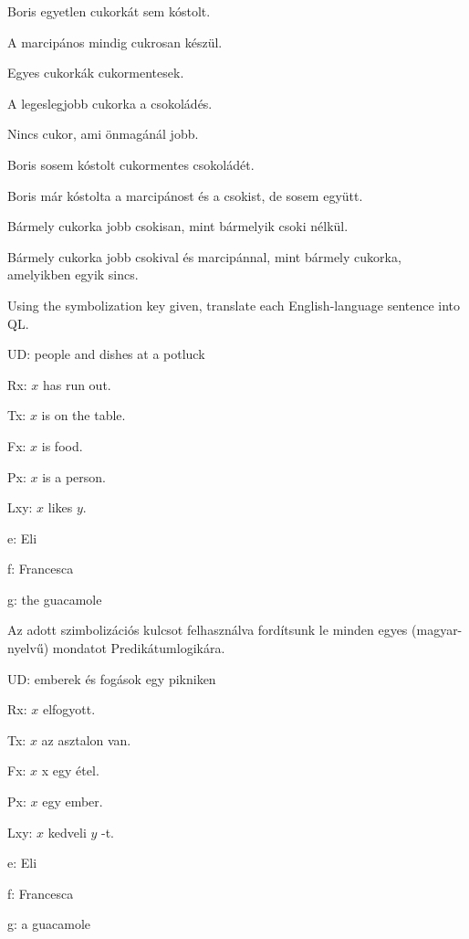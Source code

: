 \begin{earg}
\item Boris egyetlen cukorkát sem kóstolt.
\item A marcipános mindig cukrosan készül.
\item Egyes cukorkák cukormentesek.
\item A legeslegjobb cukorka a csokoládés.
\item Nincs cukor, ami önmagánál jobb.
\item Boris sosem kóstolt cukormentes csokoládét.
\item Boris már kóstolta a marcipánost és a csokist, de sosem együtt.
\item Bármely cukorka jobb csokisan, mint bármelyik csoki nélkül.
\item Bármely cukorka jobb csokival és marcipánnal, mint bármely cukorka, amelyikben egyik sincs.
\end{earg}

\problempart
Using the symbolization key given, translate each English-language sentence into QL.
\begin{ekey}
\item[UD:] people and dishes at a potluck
\item[Rx:] $x$ has run out.
\item[Tx:] $x$ is on the table.
\item[Fx:] $x$ is food.
\item[Px:] $x$ is a person.
\item[Lxy:] $x$ likes $y$.
\item[e:] Eli
\item[f:] Francesca
\item[g:] the guacamole
\end{ekey}

\problempart
Az adott szimbolizációs kulcsot felhasználva fordítsunk le minden egyes (magyar-nyelvű) mondatot Predikátumlogikára.
\begin{ekey}
\item[UD:] emberek és fogások egy pikniken
\item[Rx:] $x$ elfogyott.
\item[Tx:] $x$ az asztalon van.
\item[Fx:] $x$ x egy étel.
\item[Px:] $x$ egy ember.
\item[Lxy:] $x$ kedveli $y$ -t.
\item[e:] Eli
\item[f:] Francesca
\item[g:] a guacamole
\end{ekey}

